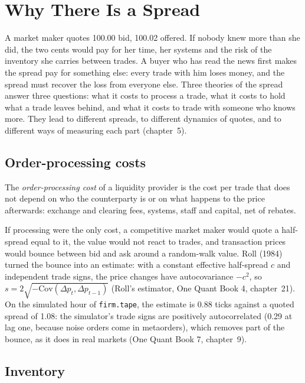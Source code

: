 \chapter{Why There Is a Spread}\label{ch:mx:why-there-is-a-spread}

A market maker quotes 100.00 bid, 100.02 offered. If nobody knew more than she did, the two cents would pay for her time, her systems and the
risk of the inventory she carries between trades. A buyer who has read the news first makes the spread pay for something else: every trade
with him loses money, and the spread must recover the loss from everyone else. Three theories of the spread answer three questions: what it
costs to process a trade, what it costs to hold what a trade leaves behind, and what it costs to trade with someone who knows more. They lead
to different spreads, to different dynamics of quotes, and to different ways of measuring each part (chapter~5).

\section{Order-processing costs}

\begin{definition}\label{def:mx:why-there-is-a-spread:processing}
The \emph{order-processing cost} of a liquidity provider is the cost per trade that does not depend on who the
counterparty is or on what happens to the price afterwards: exchange and clearing fees, systems, staff and capital, net of rebates.
\end{definition}

If processing were the only cost, a competitive market maker would quote a half-spread equal to it, the value would not react to trades, and
transaction prices would bounce between bid and ask around a random-walk value. Roll (1984) turned the bounce into an estimate: with a constant
effective half-spread $c$ and independent trade signs, the price changes have autocovariance $-c^2$, so $s = 2\sqrt{-\mathrm{Cov}(\Delta p_t,\Delta
p_{t-1})}$ (Roll's estimator, One Quant Book 4, chapter~21). On the simulated hour of \texttt{firm.tape}, the estimate is 0.88 ticks against a quoted
spread of 1.08: the simulator's trade signs are positively autocorrelated (0.29 at lag one, because noise orders come in metaorders), which removes
part of the bounce, as it does in real markets (One Quant Book 7, chapter~9).

\section{Inventory}

